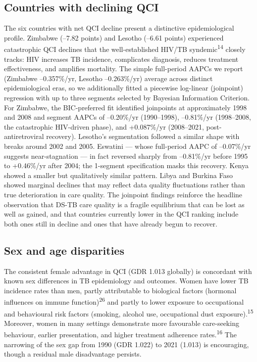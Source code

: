 \documentclass[12pt]{article}
\begin{document}
\subsection{Countries with declining QCI}

The six countries with net QCI decline present a distinctive epidemiological profile. Zimbabwe (--7.82 points) and Lesotho (--6.61 points) experienced catastrophic QCI declines that the well-established HIV/TB syndemic\textsuperscript{14} closely tracks: HIV increases TB incidence, complicates diagnosis, reduces treatment effectiveness, and amplifies mortality. The simple full-period AAPCs we report (Zimbabwe --0.357\%/yr, Lesotho --0.263\%/yr) average across distinct epidemiological eras, so we additionally fitted a piecewise log-linear (joinpoint) regression with up to three segments selected by Bayesian Information Criterion. For Zimbabwe, the BIC-preferred fit identified joinpoints at approximately 1998 and 2008 and segment AAPCs of --0.20\%/yr (1990--1998), --0.81\%/yr (1998--2008, the catastrophic HIV-driven phase), and +0.087\%/yr (2008--2021, post-antiretroviral recovery). Lesotho's segmentation followed a similar shape with breaks around 2002 and 2005. Eswatini --- whose full-period AAPC of --0.07\%/yr suggests near-stagnation --- in fact reversed sharply from --0.81\%/yr before 1995 to +0.46\%/yr after 2004; the 1-segment specification masks this recovery. Kenya showed a smaller but qualitatively similar pattern. Libya and Burkina Faso showed marginal declines that may reflect data quality fluctuations rather than true deterioration in care quality. The joinpoint findings reinforce the headline observation that DS-TB care quality is a fragile equilibrium that can be lost as well as gained, and that countries currently lower in the QCI ranking include both ones still in decline and ones that have already begun to recover.

\subsection{Sex and age disparities}

The consistent female advantage in QCI (GDR 1.013 globally) is concordant with known sex differences in TB epidemiology and outcomes. Women have lower TB incidence rates than men, partly attributable to biological factors (hormonal influences on immune function)\textsuperscript{26} and partly to lower exposure to occupational and behavioural risk factors (smoking, alcohol use, occupational dust exposure).\textsuperscript{15} Moreover, women in many settings demonstrate more favourable care-seeking behaviour, earlier presentation, and higher treatment adherence rates.\textsuperscript{16} The narrowing of the sex gap from 1990 (GDR 1.022) to 2021 (1.013) is encouraging, though a residual male disadvantage persists.
\end{document}
